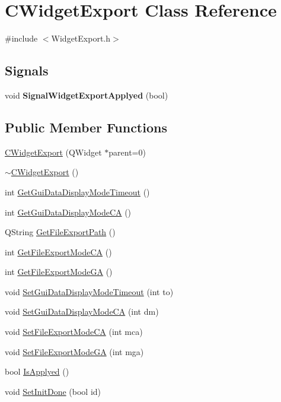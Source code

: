 \hypertarget{classCWidgetExport}{
\section{CWidgetExport Class Reference}
\label{classCWidgetExport}
}


{\ttfamily \#include $<$WidgetExport.h$>$}\subsection*{Signals}
\begin{DoxyCompactItemize}
\item 
\hypertarget{classCWidgetExport_a93dd689b74434b3dd1a647f5edd586f0}{
void {\bfseries SignalWidgetExportApplyed} (bool)}
\label{classCWidgetExport_a93dd689b74434b3dd1a647f5edd586f0}

\end{DoxyCompactItemize}
\subsection*{Public Member Functions}
\begin{DoxyCompactItemize}
\item 
\hyperlink{classCWidgetExport_a1338e5bf75c7aa778fc5bfb1c2c1fe86}{CWidgetExport} (QWidget $\ast$parent=0)
\item 
\hyperlink{classCWidgetExport_aac482b95b68cbac0a338c2b4b3d87b8a}{$\sim$CWidgetExport} ()
\item 
int \hyperlink{classCWidgetExport_ac3d5ad813625f37314a4eb2336094378}{GetGuiDataDisplayModeTimeout} ()
\item 
int \hyperlink{classCWidgetExport_ad78773bd4358d9c2fb44c454936f9d48}{GetGuiDataDisplayModeCA} ()
\item 
QString \hyperlink{classCWidgetExport_a869e5eda5f0b9c54c4c3d271f563e60a}{GetFileExportPath} ()
\item 
int \hyperlink{classCWidgetExport_ab045a70c440213701a41d26312017303}{GetFileExportModeCA} ()
\item 
int \hyperlink{classCWidgetExport_a68238c2782d4facb5517f3e8f5c2cff0}{GetFileExportModeGA} ()
\item 
void \hyperlink{classCWidgetExport_a28e7d14090b6d2d9fc39e923713d5672}{SetGuiDataDisplayModeTimeout} (int to)
\item 
void \hyperlink{classCWidgetExport_a26a3ba5025f6cb0c2f34585dc9309482}{SetGuiDataDisplayModeCA} (int dm)
\item 
void \hyperlink{classCWidgetExport_a913ccffd640ae0015a771e1e56757a93}{SetFileExportModeCA} (int mca)
\item 
void \hyperlink{classCWidgetExport_a4735fe80f78a742cbf6d81312a9688a3}{SetFileExportModeGA} (int mga)
\item 
bool \hyperlink{classCWidgetExport_a94317ca319054669a2a5c603cd708313}{IsApplyed} ()
\item 
void \hyperlink{classCWidgetExport_a0cc01c9e8ef9c95e227a3cc27f75d166}{SetInitDone} (bool id)
\end{DoxyCompactItemize}
